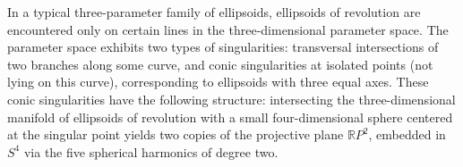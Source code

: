 In a typical three-parameter family of ellipsoids, ellipsoids of revolution are encountered only on certain lines in the three-dimensional parameter space. The parameter space exhibits two types of singularities: transversal intersections of two branches along some curve, and conic singularities at isolated points (not lying on this curve), corresponding to ellipsoids with three equal axes. These conic singularities have the following structure: intersecting the three-dimensional manifold of ellipsoids of revolution with a small four-dimensional sphere centered at the singular point yields two copies of the projective plane $\mathbb{R}P^2$, embedded in $S^4$ via the five spherical harmonics of degree two.
